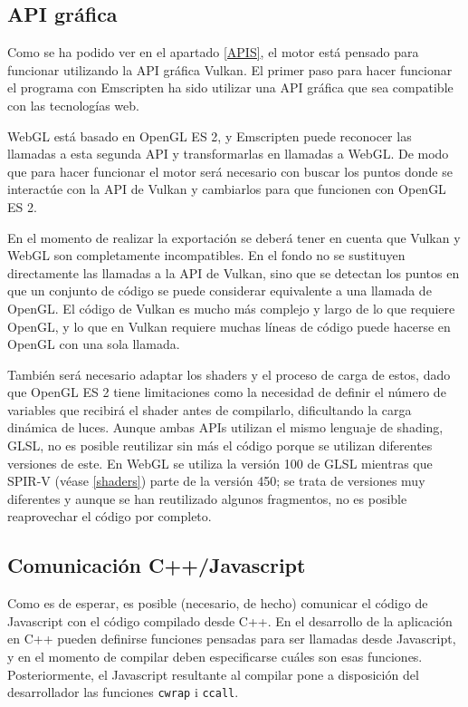 \subsection{API gráfica}
\label{emscripten_gapi}
Como se ha podido ver en el apartado \ref{APIS}, el motor está pensado para funcionar utilizando la API gráfica Vulkan. El primer paso para hacer funcionar el programa con Emscripten ha sido utilizar una API gráfica que sea compatible con las tecnologías web.

WebGL está basado en OpenGL ES 2, y Emscripten puede reconocer las llamadas a esta segunda API y transformarlas en llamadas a WebGL. De modo que para hacer funcionar el motor será necesario con buscar los puntos donde se interactúe con la API de Vulkan y cambiarlos para que funcionen con OpenGL ES 2.

En el momento de realizar la exportación se deberá tener en cuenta que Vulkan y WebGL son completamente incompatibles. En el fondo no se sustituyen directamente las llamadas a la API de Vulkan, sino que se detectan los puntos en que un conjunto de código se puede considerar equivalente a una llamada de OpenGL. El código de Vulkan es mucho más complejo y largo de lo que requiere OpenGL, y lo que en Vulkan requiere muchas líneas de código puede hacerse en OpenGL con una sola llamada.

También será necesario adaptar los shaders y el proceso de carga de estos, dado que OpenGL ES 2 tiene limitaciones como la necesidad de definir el número de variables que recibirá el shader antes de compilarlo, dificultando la carga dinámica de luces. Aunque ambas APIs utilizan el mismo lenguaje de shading, GLSL, no es posible reutilizar sin más el código porque se utilizan diferentes versiones de este. En WebGL se utiliza la versión 100 de GLSL mientras que SPIR-V (véase \ref{shaders}) parte de la versión 450; se trata de versiones muy diferentes y aunque se han reutilizado algunos fragmentos, no es posible reaprovechar el código por completo.


\subsection{Comunicación C++/Javascript}
\label{emscripten_comm}
Como es de esperar, es posible (necesario, de hecho) comunicar el código de Javascript con el código compilado desde C++. En el desarrollo de la aplicación en C++ pueden definirse funciones pensadas para ser llamadas desde Javascript, y en el momento de compilar deben especificarse cuáles son esas funciones. Posteriormente, el Javascript resultante al compilar pone a disposición del desarrollador las funciones \texttt{cwrap} i \texttt{ccall}.

